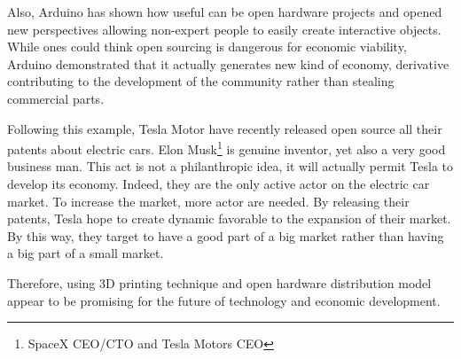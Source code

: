 Also, Arduino has shown how useful can be open hardware projects and opened new perspectives allowing non-expert people to easily create interactive objects. While ones could think open sourcing is dangerous for economic viability, Arduino demonstrated that it actually generates new kind of economy, derivative contributing to the development of the community rather than stealing commercial parts.

Following this example, Tesla Motor have recently released open source all their patents about electric cars. Elon Musk\footnote{SpaceX CEO/CTO and Tesla Motors CEO} is genuine inventor, yet also a very good business man. This act is not a philanthropic idea, it will actually permit Tesla to develop its economy. Indeed, they are the only active actor on the electric car market. To increase the market, more actor are needed. By releasing their patents, Tesla hope to create dynamic favorable to the expansion of their market. By this way, they target to have a good part of a big market rather than having a big part of a small market.

Therefore, using 3D printing technique and open hardware distribution model appear to be promising for the future of technology and economic development.
